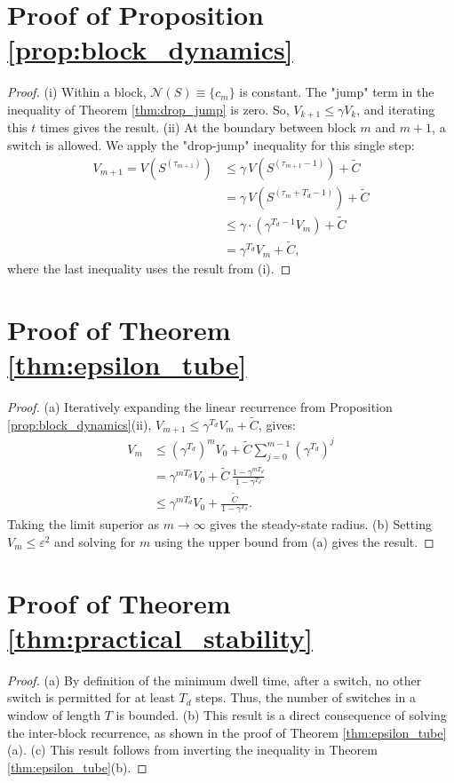 \documentclass{ccjnl}
\begin{document}
\section{Proof of Proposition \ref{prop:block_dynamics}}
\label{app:proof_prop_block_dynamics}
\begin{proof}
(i) Within a block, $\mathcal N(S)\equiv\{c_m\}$ is constant. The "jump" term in the inequality of Theorem \ref{thm:drop_jump} is zero. So, $V_{k+1}\le \gamma V_k$, and iterating this $t$ times gives the result.
(ii) At the boundary between block $m$ and $m+1$, a switch is allowed. We apply the "drop-jump" inequality for this single step:
\begin{equation}
\begin{split}
V_{m+1} = V(S^{(\tau_{m+1})}) & \le \gamma\,V(S^{(\tau_{m+1}-1)}) + \tilde C \\
& = \gamma\,V(S^{(\tau_m+T_d-1)}) + \tilde C \\
& \le \gamma \cdot (\gamma^{T_d-1}V_m) + \tilde C \\
& = \gamma^{T_d}V_m + \tilde C,
\end{split}
\end{equation}
where the last inequality uses the result from (i).
\end{proof}

\section{Proof of Theorem \ref{thm:epsilon_tube}}
\label{app:proof_thm_epsilon_tube}
\begin{proof}
(a) Iteratively expanding the linear recurrence from Proposition \ref{prop:block_dynamics}(ii), $V_{m+1}\le \gamma^{T_d}V_m+\tilde C$, gives:
\begin{equation}
\begin{split}
V_m &\le (\gamma^{T_d})^m V_0 + \tilde C \sum_{j=0}^{m-1}(\gamma^{T_d})^j \\
    &= \gamma^{mT_d}V_0 + \tilde C\,\frac{1-\gamma^{mT_d}}{1-\gamma^{T_d}} \\
    &\le \gamma^{mT_d}V_0+\frac{\tilde C}{1-\gamma^{T_d}}.
\end{split}
\end{equation}
Taking the limit superior as $m\to\infty$ gives the steady-state radius.
(b) Setting $V_m\le \varepsilon^2$ and solving for $m$ using the upper bound from (a) gives the result.
\end{proof}

\section{Proof of Theorem \ref{thm:practical_stability}}
\label{app:proof_thm_practical_stability}
\begin{proof}
(a) By definition of the minimum dwell time, after a switch, no other switch is permitted for at least $T_d$ steps. Thus, the number of switches in a window of length $T$ is bounded.
(b) This result is a direct consequence of solving the inter-block recurrence, as shown in the proof of Theorem \ref{thm:epsilon_tube}(a).
(c) This result follows from inverting the inequality in Theorem \ref{thm:epsilon_tube}(b).
\end{proof}
\end{document}
